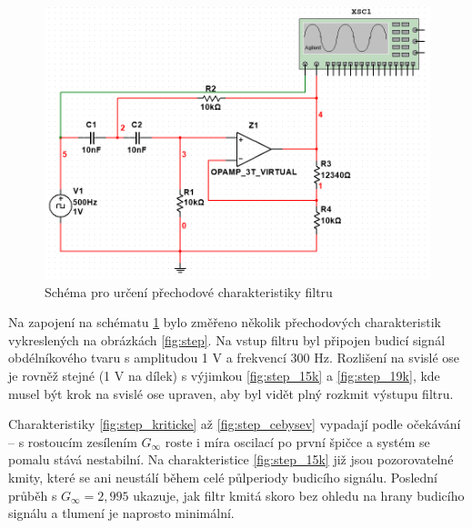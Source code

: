 \documentclass[twoside]{article}
\begin{document}
\begin{figure}[h!]
    \centering
    \includegraphics[width=0.8\linewidth]{step_schema.png}
    \caption{Schéma pro určení přechodové charakteristiky filtru}
    \label{fig:schema_step}
\end{figure}

Na zapojení na schématu \ref{fig:schema_step} bylo změřeno několik přechodových charakteristik
vykreslených na obrázkách \ref{fig:step}. Na vstup filtru byl připojen budicí signál 
obdélníkového tvaru s amplitudou 1 V a frekvencí 300 Hz. Rozlišení na svislé ose je 
rovněž stejné (1 V na dílek) s výjimkou \ref{fig:step_15k} a \ref{fig:step_19k}, kde musel být krok na svislé ose upraven,
aby byl vidět plný rozkmit výstupu filtru.

Charakteristiky \ref{fig:step_kriticke} až \ref{fig:step_cebysev} vypadají podle očekávání -- 
s rostoucím zesílením $G_{\infty}$ roste i míra oscilací po první špičce a systém se pomalu stává nestabilní. Na charakteristice 
\ref{fig:step_15k} již jsou pozorovatelné kmity, které se ani neustálí během celé půlperiody budicího signálu. Poslední průběh s $G_{\infty} = 2,995$ ukazuje,
jak filtr kmitá skoro bez ohledu na hrany budicího signálu a tlumení je naprosto minimální.
\end{document}
